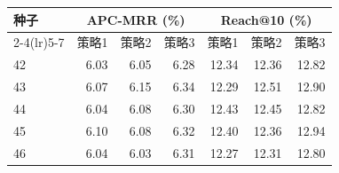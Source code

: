 \begin{tabular}{lrrrrrr}
\toprule
种子 & \multicolumn{3}{c}{APC-MRR (\%)} & \multicolumn{3}{c}{Reach@10 (\%)} \\
\cmidrule(lr){2-4}\cmidrule(lr){5-7}
 & 策略1 & 策略2 & 策略3 & 策略1 & 策略2 & 策略3 \\
\midrule
42 & 6.03 & 6.05 & 6.28 & 12.34 & 12.36 & 12.82 \\
43 & 6.07 & 6.15 & 6.34 & 12.29 & 12.51 & 12.90 \\
44 & 6.04 & 6.08 & 6.30 & 12.43 & 12.45 & 12.82 \\
45 & 6.10 & 6.08 & 6.32 & 12.40 & 12.36 & 12.94 \\
46 & 6.04 & 6.03 & 6.31 & 12.27 & 12.31 & 12.80 \\
\bottomrule
\end{tabular}
